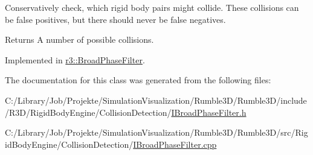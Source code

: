 Conservatively check, which rigid body pairs might collide. These collisions can be false positives, but there should never be false negatives. \begin{DoxyReturn}{Returns}
A number of possible collisions. 
\end{DoxyReturn}


Implemented in \mbox{\hyperlink{classr3_1_1_broad_phase_filter_a0435dc6468401e32bf151f84f52e80f8}{r3\+::\+Broad\+Phase\+Filter}}.



The documentation for this class was generated from the following files\+:\begin{DoxyCompactItemize}
\item 
C\+:/\+Library/\+Job/\+Projekte/\+Simulation\+Visualization/\+Rumble3\+D/\+Rumble3\+D/include/\+R3\+D/\+Rigid\+Body\+Engine/\+Collision\+Detection/\mbox{\hyperlink{_i_broad_phase_filter_8h}{I\+Broad\+Phase\+Filter.\+h}}\item 
C\+:/\+Library/\+Job/\+Projekte/\+Simulation\+Visualization/\+Rumble3\+D/\+Rumble3\+D/src/\+Rigid\+Body\+Engine/\+Collision\+Detection/\mbox{\hyperlink{_i_broad_phase_filter_8cpp}{I\+Broad\+Phase\+Filter.\+cpp}}\end{DoxyCompactItemize}
